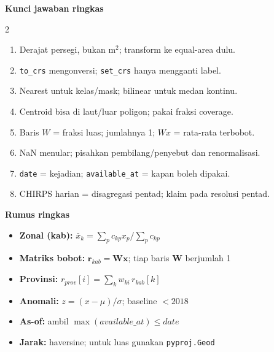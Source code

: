 \documentclass[9pt,a4paper]{extarticle}
\newcommand{\code}[1]{\texttt{\small\color{ink}#1}}
\begin{document}
\begin{tcolorbox}[enhanced,colback=bg,colframe=bg,boxrule=0pt,arc=1mm,left=3mm,right=3mm,top=2mm,bottom=2mm]
{\sffamily\bfseries\color{ink}Kunci jawaban ringkas}
\begin{multicols}{2}
\begin{enumerate}[leftmargin=1.15em,itemsep=0.2pt,font=\footnotesize]
  \item Derajat persegi, bukan m$^2$; transform ke equal-area dulu.
  \item \code{to\_crs} mengonversi; \code{set\_crs} hanya mengganti label.
  \item Nearest untuk kelas/mask; bilinear untuk medan kontinu.
  \item Centroid bisa di laut/luar poligon; pakai fraksi coverage.
  \item Baris $W$ = fraksi luas; jumlahnya 1; $Wx$ = rata-rata terbobot.
  \item NaN menular; pisahkan pembilang/penyebut dan renormalisasi.
  \item \code{date} = kejadian; \code{available\_at} = kapan boleh dipakai.
  \item CHIRPS harian = disagregasi pentad; klaim pada resolusi pentad.
\end{enumerate}
\end{multicols}
\end{tcolorbox}

\begin{tcolorbox}[enhanced,colback=bg,colframe=bg,boxrule=0pt,arc=1mm,left=3mm,right=3mm,top=2mm,bottom=2mm]
{\sffamily\bfseries\color{ink}Rumus ringkas}
\begin{itemize}[leftmargin=1.2em,itemsep=0.15pt,topsep=1pt,font=\footnotesize]
  \item \textbf{Zonal (kab):} $\bar{x}_k = \sum_p c_{kp}x_p \big/ \sum_p c_{kp}$
  \item \textbf{Matriks bobot:} $\mathbf{r}_{kab}=\mathbf{W}\mathbf{x}$; tiap baris $\mathbf{W}$ berjumlah 1
  \item \textbf{Provinsi:} $r_{prov}[i]=\sum_k w_{ki}\,r_{kab}[k]$
  \item \textbf{Anomali:} $z=(x-\mu)/\sigma$; baseline $<2018$
  \item \textbf{As-of:} ambil $\max(available\_at)\le date$
  \item \textbf{Jarak:} haversine; untuk luas gunakan \code{pyproj.Geod}
\end{itemize}
\end{tcolorbox}
\end{document}
